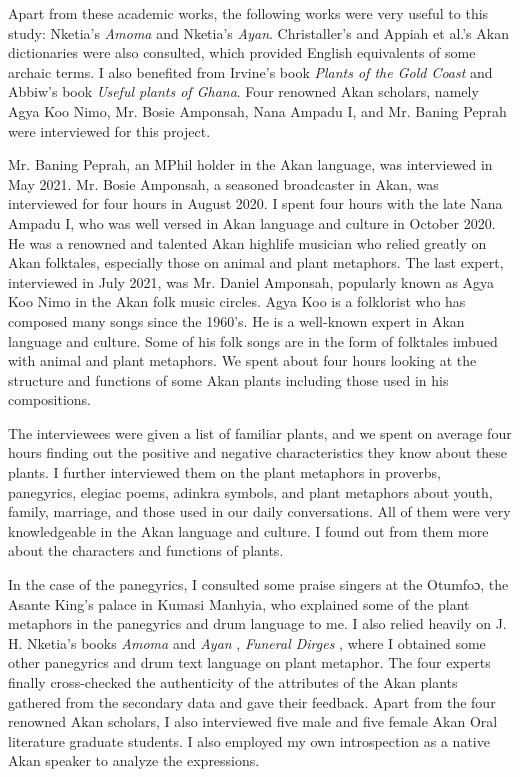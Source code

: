\documentclass[output=paper,colorlinks,citecolor=brown]{langscibook}
\begin{document}
Apart from these academic works, the following works were very useful to this study: Nketia’s \citeyearpar{Nketia1978} \textit{Amoma} and Nketia's \citeyearpar{Nketia1974} \textit{Ayan}. Christaller's \citeyearpar{Christaller1933} and Appiah et 
al.'s \citeyearpar{Appiahetal2000} Akan dictionaries were also consulted, which provided English equivalents of some archaic terms. I also benefited from Irvine’s \citeyearpar{Irvine1930} book \textit{Plants of the Gold Coast} and Abbiw’s \citeyearpar{Abbiw1990} book \textit{Useful plants of Ghana}. Four renowned Akan scholars, namely Agya Koo Nimo, Mr. Bosie Amponsah, Nana Ampadu I, and Mr. Baning Peprah were interviewed for this project. 

Mr. Baning Peprah, an MPhil holder in the Akan language, was interviewed in May 2021. Mr. Bosie Amponsah, a seasoned broadcaster in Akan, was interviewed for four hours in August 2020. I spent four hours with the late Nana Ampadu I, who was well versed in Akan language and culture in October 2020. He was a renowned and talented Akan highlife musician who relied greatly on Akan folktales, especially those on animal and plant metaphors. The last expert, interviewed in July 2021, was Mr. Daniel Amponsah, popularly known as Agya Koo Nimo in the Akan folk music circles. Agya Koo is a folklorist who has composed many songs since the 1960’s. He is a well-known expert in Akan language and culture. Some of his folk songs are in the form of folktales imbued with animal and plant metaphors. We spent about four hours looking at the structure and functions of some Akan plants including those used in his compositions.

The interviewees were given a list of familiar plants, and we spent on average four hours finding out the positive and negative characteristics they know about these plants. I further interviewed them on the plant metaphors in proverbs, panegyrics, elegiac poems, adinkra symbols, and plant metaphors about youth, family, marriage, and those used in our daily conversations. All of them were very knowledgeable in the Akan language and culture. I found out from them more about the characters and functions of plants.

In the case of the panegyrics, I consulted some praise singers at the Otumfoɔ, the Asante King’s palace in Kumasi Manhyia, who explained some of the plant metaphors in the panegyrics and drum language to me. I also relied heavily on J. H. Nketia’s books \textit{Amoma} \citeyearpar{Nketia1978} and \textit{Ayan} \citeyearpar{Nketia1974}, \textit{Funeral Dirges} \citeyearpar{Nketia1955}, where I obtained some other panegyrics and drum text language on plant metaphor. The four experts finally cross-checked the authenticity of the attributes of the Akan plants gathered from the secondary data and gave their feedback. Apart from the four renowned Akan scholars, I also interviewed five male and five female Akan Oral literature graduate students. I also employed my own introspection as a native Akan speaker to analyze the expressions.
\end{document}
